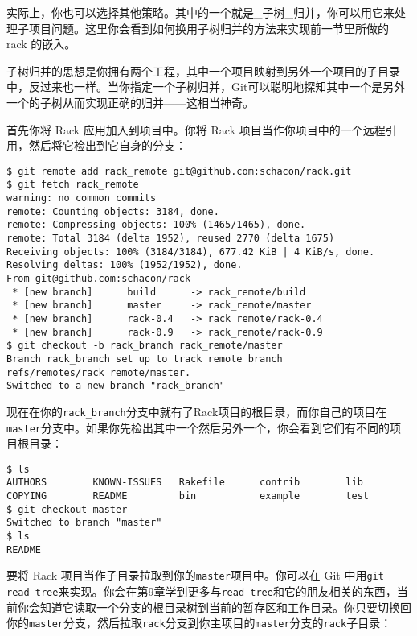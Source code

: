 \documentclass[a4paper]{book}
\newcommand{\prechap}{第}
\newcommand{\postchap}{章}
\newcommand{\chapref}[1]{\hyperref[chap:#1]{\prechap #1\postchap}}
\begin{document}
实际上，你也可以选择其他策略。其中的一个就是\_子树\_归并，你可以用它来处理子项目问题。这里你会看到如何换用子树归并的方法来实现前一节里所做的 rack 的嵌入。

子树归并的思想是你拥有两个工程，其中一个项目映射到另外一个项目的子目录中，反过来也一样。当你指定一个子树归并，Git可以聪明地探知其中一个是另外一个的子树从而实现正确的归并------这相当神奇。

首先你将 Rack 应用加入到项目中。你将 Rack 项目当作你项目中的一个远程引用，然后将它检出到它自身的分支：

\begin{shaded}\begin{verbatim}
$ git remote add rack_remote git@github.com:schacon/rack.git
$ git fetch rack_remote
warning: no common commits
remote: Counting objects: 3184, done.
remote: Compressing objects: 100% (1465/1465), done.
remote: Total 3184 (delta 1952), reused 2770 (delta 1675)
Receiving objects: 100% (3184/3184), 677.42 KiB | 4 KiB/s, done.
Resolving deltas: 100% (1952/1952), done.
From git@github.com:schacon/rack
 * [new branch]      build      -> rack_remote/build
 * [new branch]      master     -> rack_remote/master
 * [new branch]      rack-0.4   -> rack_remote/rack-0.4
 * [new branch]      rack-0.9   -> rack_remote/rack-0.9
$ git checkout -b rack_branch rack_remote/master
Branch rack_branch set up to track remote branch refs/remotes/rack_remote/master.
Switched to a new branch "rack_branch"
\end{verbatim}\end{shaded}

现在在你的\texttt{rack\_branch}分支中就有了Rack项目的根目录，而你自己的项目在\texttt{master}分支中。如果你先检出其中一个然后另外一个，你会看到它们有不同的项目根目录：

\begin{shaded}\begin{verbatim}
$ ls
AUTHORS	       KNOWN-ISSUES   Rakefile      contrib	       lib
COPYING	       README         bin           example	       test
$ git checkout master
Switched to branch "master"
$ ls
README
\end{verbatim}\end{shaded}

要将 Rack 项目当作子目录拉取到你的\texttt{master}项目中。你可以在 Git 中用\texttt{git read-tree}来实现。你会在\chapref{9}学到更多与\texttt{read-tree}和它的朋友相关的东西，当前你会知道它读取一个分支的根目录树到当前的暂存区和工作目录。你只要切换回你的\texttt{master}分支，然后拉取\texttt{rack}分支到你主项目的\texttt{master}分支的\texttt{rack}子目录：
\end{document}
